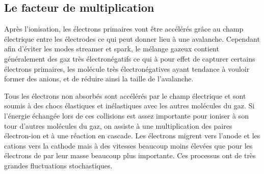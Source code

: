 \subsection{Le facteur de multiplication}
Après l'ionisation, les électrons primaires vont être accélérés grâce au champ électrique entre les électrodes ce qui peut donner lieu à une avalanche. Cependant afin d'éviter les modes streamer et spark, le mélange gazeux contient généralement des gaz très électronégatifs ce qui à pour effet de capturer certains électrons primaires, les molécule très électronégatives ayant tendance à vouloir former des anions, et de réduire ainsi la taille de l'avalanche. 

Tous les électrons non absorbés sont accélérés par le champ électrique et sont soumis à des chocs élastiques et inélastiques avec les autres molécules du gaz. Si l'énergie échangée lors de ces collisions est assez importante pour ioniser à son tour d'autres molécules du gaz, on assiste à une multiplication des paires électron-ion et à une réaction en cascade. Les électrons migrent vers l'anode et les cations vers la cathode mais à des vitesses beaucoup moins élevées que pour les électrons de par leur masse beaucoup plus importante. Ces processus ont de très grandes fluctuations stochastiques.

